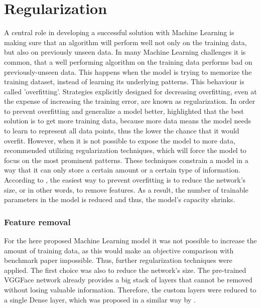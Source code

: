 \section{Regularization}
A central role in developing a successful solution with Machine Learning is making sure that an algorithm will perform well not only on the training data, but also on previously unseen data. In many Machine Learning challenges it is common, that a well performing algorithm on the training data performs bad on previously-unseen data. This happens when the model is trying to memorize the training dataset, instead of learning its underlying patterns. This behaviour is called 'overfitting'. Strategies explicitly designed for decreasing overfitting, even at the expense of increasing the training error, are known as regularization. \citep{Goodfellow:2016:DeepLearning}
\newline\newline
In order to prevent overfitting and generalize a model better, \citet{Chollet:2017:DeepLearningPython} highlighted that the best solution is to get more training data, because more data means the model needs to learn to represent all data points, thus the lower the chance that it would overfit. However, when it is not possible to expose the model to more data, \citet{Chollet:2017:DeepLearningPython} recommended utilizing regularization techniques, which will force the model to focus on the most prominent patterns. These techniques constrain a model in a way that it can only store a certain amount or a certain type of information. According to \citet{Chollet:2017:DeepLearningPython}, the easiest way to prevent overfitting is to reduce the network's size, or in other words, to remove features. As a result, the number of trainable parameters in the model is reduced and thus, the model's capacity shrinks.

\subsubsection{Feature removal}
For the here proposed Machine Learning model it was not possible to increase the amount of training data, as this would make an objective comparison with benchmark paper impossible. Thus, further regularization techniques were applied. The first choice was also to reduce the network's size. The pre-trained VGGFace network already provides a big stack of layers that cannot be removed without losing valuable information. Therefore, the custom layers were reduced to a single Dense layer, which was proposed in a similar way by \citet{Pittaras:2017:FineTuningStrategiesComparison}.

